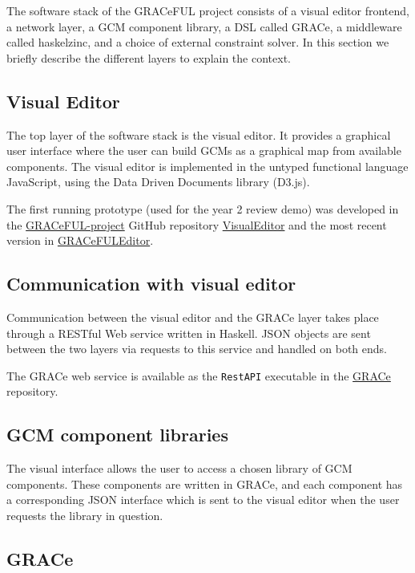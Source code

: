 The software stack of the GRACeFUL project consists of
%
a visual editor frontend,
%
a network layer,
%
a GCM component library,
%
a DSL called GRACe,
%
a middleware called haskelzinc, and
%
a choice of external constraint solver.
%
In this section we briefly describe the different layers to explain
the context.

\subsection*{Visual Editor}

The top layer of the software stack is the visual editor.
%
It provides a graphical user interface where the user can build GCMs
as a graphical map from available components.
%
The visual editor is implemented in the untyped functional language
JavaScript, using the Data Driven Documents library (D3.js).
%

The first running prototype (used for the year 2 review demo) was
developed in the
\href{https://github.com/GRACeFUL-project}{GRACeFUL-project} GitHub
repository
\href{https://github.com/GRACeFUL-project/VisualEditor}{VisualEditor}
and the most recent version in
\href{https://github.com/GRACeFUL-project/GRACeFULEditor}{GRACeFULEditor}.

\subsection*{Communication with visual editor}

Communication between the visual editor and the GRACe layer takes
place through a RESTful Web service written in Haskell.
%
JSON objects are sent between the two layers via requests to this
service and handled on both ends.

The GRACe web service is available as the \texttt{RestAPI} executable in the
\href{https://github.com/GRACeFUL-project/GRACe}{GRACe} repository.

\subsection*{GCM component libraries}

The visual interface allows the user to access a chosen library of GCM
components.
%
These components are written in GRACe, and each component has a
corresponding JSON interface which is sent to the visual editor when
the user requests the library in question.

\subsection*{GRACe}

